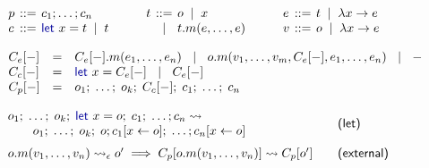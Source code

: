 \documentclass[english,submission]{programming}
\theoremstyle{plain}
\theoremstyle{definition}
\newcommand{\lsep}{\;\;|\;\;}
\newcommand{\kvd}[1]{\textnormal{\textcolor{kvdclr}{\sffamily #1}}}
\newcommand{\narrow}[1]{\hspace{-0.6em}#1\hspace{-0.6em}}
\newcommand{\rname}[1]{{\sffamily(#1)}}
\begin{document}

\begin{figure}
\vspace{-0.5em}
\raggedright
\hspace{0.5em}{\small\sffamily Programs, commands, terms, expressions and values}
\vspace{-0.5em}
\begin{equation*}
\begin{array}{lcl}
p &\narrow{::=}& c_1; \ldots; c_n\\
c &\narrow{::=}& \kvd{let}~x = t \lsep t\\
\end{array}
\qquad
\begin{array}{lcl}
t &\narrow{::=}& o \lsep x \\
  &\narrow{|}& t.m(e, \ldots, e)
\end{array}
\qquad
\begin{array}{lcl}
e &\narrow{::=}& t \lsep \lambda x\rightarrow e\\
v &\narrow{::=}& o \lsep \lambda x\rightarrow e\\
\end{array}
\end{equation*}

\vspace{0.5em}
\hspace{0.5em}{\small\sffamily Evaluation contexts of expressions}
\vspace{-0.5em}
\begin{equation*}
\begin{array}{lcl}
C_e[-] &=& C_e[-].m(e_1, \ldots, e_n) ~\lsep~ o.m(v_1, \ldots, v_{m}, C_e[-], e_1,\ldots , e_n) ~\lsep~ -\\
C_c[-] &=& \kvd{let}~x = C_e[-] ~\lsep~ C_e[-]\\
C_p[-] &=& o_1;\; \ldots;\; o_{k};\; C_c[-];\; c_{1};\; \ldots;\; c_n\\
\end{array}
\end{equation*}

\vspace{0.5em}
\hspace{0.5em}{\small\sffamily Let elimination and member reduction}
\vspace{-0.5em}
\begin{equation*}
\begin{array}{ll}
\hspace{-0.5em}\begin{array}{l}
o_1;\; \ldots;\; o_{k};\; \kvd{let}~x=o;\; c_{1};\; \ldots; c_n \rightsquigarrow\\
\qquad  o_1;\; \ldots;\; o_{k};\; o; c_{1}[x\leftarrow o];\; \ldots; c_n[x\leftarrow o]\end{array} &
\quad\text{\rname{let}}\\[1.2em]
{o.m(v_1, \ldots, v_n) \rightsquigarrow_\epsilon o'}\implies
  {C_p[o.m(v_1, \ldots, v_n)] \rightsquigarrow C_p[o']} &
\quad\text{\rname{external}}
\end{array}
\end{equation*}


\end{figure}
\end{document}
